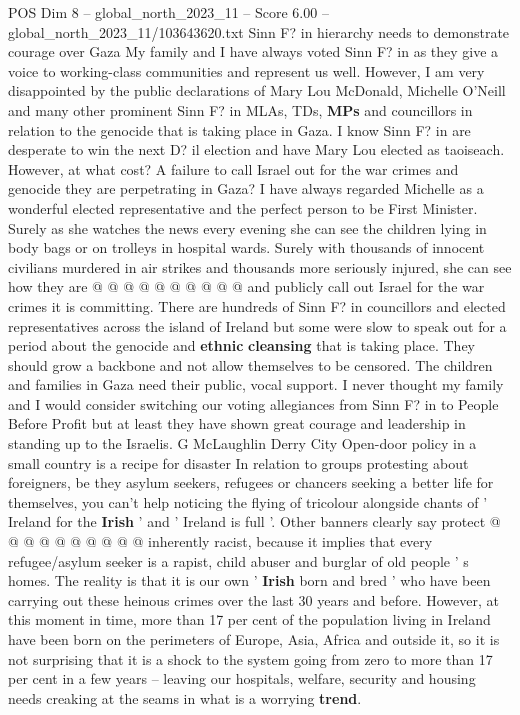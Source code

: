 \begin{textsample}{POS Dim 8 – global\_north\_2023\_11 – Score 6.00 – global\_north\_2023\_11/103643620.txt}  \label{ex:f8_pos_182}
Sinn F? in hierarchy needs to demonstrate courage over Gaza My family and I have always voted Sinn F? in as they give a voice to working-class communities and represent us well.
However, I am very disappointed by the public declarations of Mary Lou McDonald, Michelle O'Neill and many other prominent Sinn F? in MLAs, TDs, \textbf{MPs} and councillors in relation to the genocide that is taking place in Gaza.
I know Sinn F? in are desperate to win the next D? il election and have Mary Lou elected as taoiseach.
However, at what cost?
A failure to call Israel out for the war crimes and genocide they are perpetrating in Gaza?
I have always regarded Michelle as a wonderful elected representative and the perfect person to be First Minister.
Surely as she watches the news every evening she can see the children lying in body bags or on trolleys in hospital wards.
Surely with thousands of innocent civilians murdered in air strikes and thousands more seriously injured, she can see how they are @ @ @ @ @ @ @ @ @ @ and publicly call out Israel for the war crimes it is committing.
There are hundreds of Sinn F? in councillors and elected representatives across the island of Ireland but some were slow to speak out for a period about the genocide and \textbf{ethnic} \textbf{cleansing} that is taking place.
They should grow a backbone and not allow themselves to be censored.
The children and families in Gaza need their public, vocal support.
I never thought my family and I would consider switching our voting allegiances from Sinn F? in to People Before Profit but at least they have shown great courage and leadership in standing up to the Israelis.
G McLaughlin Derry City Open-door policy in a small country is a recipe for disaster In relation to groups protesting about foreigners, be they asylum seekers, refugees or chancers seeking a better life for themselves, you can't help noticing the flying of tricolour alongside chants of ' Ireland for the \textbf{Irish} ' and ' Ireland is full '.
Other banners clearly say protect @ @ @ @ @ @ @ @ @ @ inherently racist, because it implies that every refugee/asylum seeker is a rapist, child abuser and burglar of old people ' s homes.
The reality is that it is our own ' \textbf{Irish} born and bred ' who have been carrying out these heinous crimes over the last 30 years and before.
However, at this moment in time, more than 17 per cent of the population living in Ireland have been born on the perimeters of Europe, Asia, Africa and outside it, so it is not surprising that it is a shock to the system going from zero to more than 17 per cent in a few years -- leaving our hospitals, welfare, security and housing needs creaking at the seams in what is a worrying \textbf{trend}.

\end{textsample}
